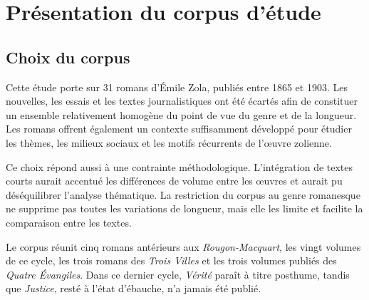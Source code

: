 \section{Présentation du corpus d'étude}

\subsection{Choix du corpus}
Cette étude porte sur 31 romans d'Émile Zola, publiés entre 1865 et 1903. Les nouvelles, les essais et les textes journalistiques ont été écartés afin de constituer un ensemble relativement homogène du point de vue du genre et de la longueur. Les romans offrent également un contexte suffisamment développé pour étudier les thèmes, les milieux sociaux et les motifs récurrents de l'œuvre zolienne.

Ce choix répond aussi à une contrainte méthodologique. L'intégration de textes courts aurait accentué les différences de volume entre les œuvres et aurait pu déséquilibrer l'analyse thématique. La restriction du corpus au genre romanesque ne supprime pas toutes les variations de longueur, mais elle les limite et facilite la comparaison entre les textes.

Le corpus réunit cinq romans antérieurs aux \textit{Rougon-Macquart}, les vingt volumes de ce cycle, les trois romans des \textit{Trois Villes} et les trois volumes publiés des \textit{Quatre Évangiles}. Dans ce dernier cycle, \textit{Vérité} paraît à titre posthume, tandis que \textit{Justice}, resté à l'état d'ébauche, n'a jamais été publié.


